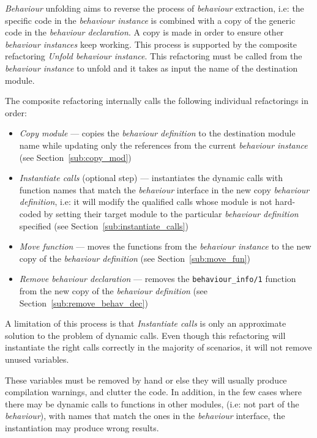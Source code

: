 \emph{Behaviour} unfolding aims to reverse the process of \emph{behaviour}
extraction, i.e: the specific code in the \emph{behaviour instance}
is combined with a copy of the generic code in the \emph{behaviour
declaration}. A copy is made in order to ensure other \emph{behaviour
instances} keep working. This process is supported by the composite
refactoring \emph{Unfold behaviour instance}. This refactoring must
be called from the \emph{behaviour instance} to unfold and it takes
as input the name of the destination module.

The composite refactoring internally calls the following individual
refactorings in order:
\begin{itemize}
\item \emph{Copy module} --- copies the \emph{behaviour definition} to the
destination module name while updating only the references from the
current \emph{behaviour instance} (see Section~\ref{sub:copy_mod})
\item \emph{Instantiate calls} (optional step) --- instantiates the dynamic
calls with function names that match the \emph{behaviour} interface
in the new copy \emph{behaviour definition}, i.e: it will modify the
qualified calls whose module is not hard-coded by setting their target
module to the particular \emph{behaviour definition} specified (see
Section~\ref{sub:instantiate_calls})
\item \emph{Move function} --- moves the functions from the \emph{behaviour
instance} to the new copy of the \emph{behaviour definition} (see
Section~\ref{sub:move_fun})
\item \emph{Remove behaviour declaration} --- removes the \texttt{behaviour\_info/1}
function from the new copy of the \emph{behaviour definition} (see
Section~\ref{sub:remove_behav_dec})
\end{itemize}
A limitation of this process is that \emph{Instantiate calls} is only
an approximate solution to the problem of dynamic calls. Even though
this refactoring will instantiate the right calls correctly in the
majority of scenarios, it will not remove unused variables.

These variables must be removed by hand or else they will usually
produce compilation warnings, and clutter the code. In addition, in
the few cases where there may be dynamic calls to functions in other
modules, (i.e: not part of the \emph{behaviour}), with names that
match the ones in the \emph{behaviour} interface, the instantiation
may produce wrong results.

